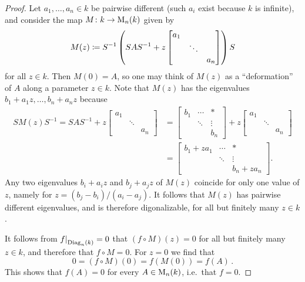 \begin{proof}
  Let $a_1, \dotsc, a_n \in k$ be pairwise different (such $a_i$ exist because $k$ is infinite), and consider the map $M \colon k \to \operatorname{M}_n(k)$ given by
  \[
              M(z)
    \coloneqq  S^{-1}
              \left(
              S A S^{-1}
              + z
              \begin{bmatrix}
                a_1 &         &     \\
                    & \ddots  &     \\
                    &         & a_n
              \end{bmatrix}
              \right)
              S
  \]
  for all $z \in k$.
  Then $M(0) = A$, so one may think of $M(z)$ as a \enquote{deformation} of $A$ along a parameter $z \in k$.
  Note that $M(z)$ has the eigenvalues $b_1 + a_1 z, \dotsc, b_n + a_n z$ because
  \begin{align*}
      S M(z) S^{-1}
    =     S A S^{-1}
        + z
        \begin{bmatrix}
          a_1 &         &     \\
              & \ddots  &     \\
              &         & a_n
        \end{bmatrix}
    &=  \begin{bmatrix}
          b_1 & \cdots  & *       \\
              & \ddots  & \vdots  \\
              &         & b_n
        \end{bmatrix}
        + z
        \begin{bmatrix}
          a_1 &         &     \\
              & \ddots  &     \\
              &         & a_n
        \end{bmatrix} \\
    &=  \begin{bmatrix}
          b_1 + z a_1 & \cdots  & *           \\
                      & \ddots  & \vdots      \\
                      &         & b_n + z a_n
        \end{bmatrix}.
  \end{align*}
  Any two eigenvalues $b_i + a_i z$ and $b_j + a_j z$ of $M(z)$ coincide for only one value of $z$, namely for $z = (b_j - b_i)/(a_i - a_j)$.
  It follows that $M(z)$ has pairwise different eigenvalues, and is therefore digonalizable, for all but finitely many $z \in k$.
  
  It follows from $\restrict{f}{\Diag_n(k)} = 0$ that $(f \circ M)(z) = 0$ for all but finitely many $z \in k$, and therefore that $f \circ M = 0$.
  For $z = 0$ we find that
  \[
      0
    = (f \circ M)(0)
    = f(M(0))
    = f(A) \,.
  \]
  This shows that $f(A) = 0$ for every $A \in \operatorname{M}_n(k)$, i.e.\ that $f = 0$.
\end{proof}


